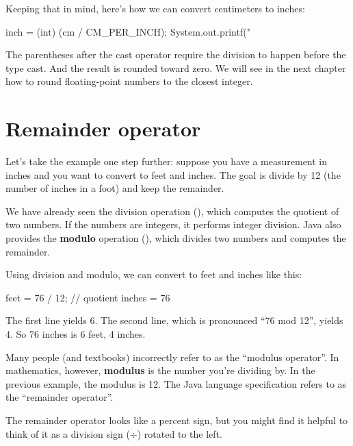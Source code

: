 
Keeping that in mind, here's how we can convert centimeters to inches:

\begin{code}
inch = (int) (cm / CM_PER_INCH);
System.out.printf("%
\end{code}

The parentheses after the cast operator require the division to happen before the type cast.
And the result is rounded toward zero.
We will see in the next chapter how to round floating-point numbers to the closest integer.


\section{Remainder operator}

Let's take the example one step further: suppose you have a measurement in inches and you want to convert to feet and inches.
The goal is divide by 12 (the number of inches in a foot) and keep the remainder.


We have already seen the division operation (\java{/}), which computes the quotient of two numbers.
If the numbers are integers, it performs integer division.
Java also provides the {\bf modulo} operation (\java{\%}), which divides two numbers and computes the remainder.

Using division and modulo, we can convert to feet and inches like this:

\begin{code}
feet = 76 / 12;    // quotient
inches = 76 %
\end{code}

The first line yields 6.
The second line, which is pronounced ``76 mod 12'', yields 4.
So 76 inches is 6 feet, 4 inches.


Many people (and textbooks) incorrectly refer to \java{\%} as the ``modulus operator''.
In mathematics, however, {\bf modulus} is the number you're dividing by.
In the previous example, the modulus is 12.
The Java language specification refers to  \java{\%} as the ``remainder operator''.

The remainder operator looks like a percent sign, but you might find it helpful to think of it as a division sign ($\div$) rotated to the left.

